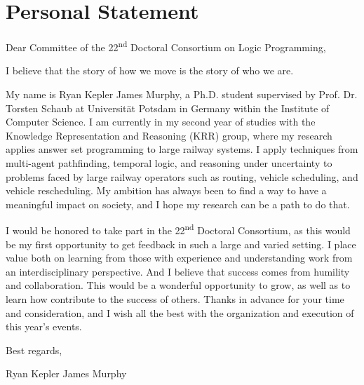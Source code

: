 \documentclass[]{include/latex-class-ceurart/ceurart}
\begin{document}
\section*{Personal Statement}
Dear Committee of the 22\textsuperscript{nd} Doctoral Consortium on Logic Programming,
\bigskip

\noindent
I believe that the story of how we move is the story of who we are.
\medskip

\noindent
My name is Ryan Kepler James Murphy,
a Ph.D. student supervised by Prof. Dr. Torsten Schaub
at Universit\"at Potsdam in Germany
within the Institute of Computer Science.
I am currently in my second year of studies
with the Knowledge Representation and Reasoning (KRR) group,
where my research applies answer set programming to large railway systems. 
I apply techniques from
multi-agent pathfinding,
temporal logic,
and reasoning under uncertainty
to problems faced by large railway operators
such as
routing,
vehicle scheduling, and
vehicle rescheduling.
My ambition has always been to find a way to have a meaningful impact
on society, and I hope my research can be a path to do that.
\medskip

\noindent
I would be honored to take part in the 22\textsuperscript{nd} Doctoral Consortium,
as this would be my first opportunity to get feedback in such a large and varied setting.
I place value both on learning from those with experience and
understanding work from an interdisciplinary perspective.
And I believe that success comes from humility and collaboration.
This would be a wonderful opportunity to grow, 
as well as to learn how contribute to the success of others.
Thanks in advance for your time and consideration,
and I wish all the best with the organization and execution of this year's events.

\bigskip
\bigskip
\noindent
Best regards,

\bigskip
\bigskip
\bigskip
\bigskip
\noindent
Ryan Kepler James Murphy
\end{document}
